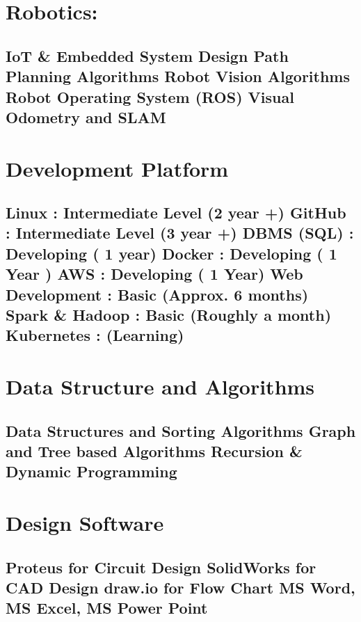 \documentclass[letterpaper]{twentysecondcv} %
\begin{document}
{\section{\large Robotics:}\subsection{\small  
\textbf{IoT \& Embedded System Design} 
\newline Path Planning Algorithms 
\newline Robot Vision Algorithms 
\newline Robot Operating System \textbf{(ROS)}
\newline \textbf{Visual Odometry and SLAM}}

\section{\large Development Platform} \subsection{\small \textbf{Linux} : Intermediate Level (2 year +) \newline \textbf{GitHub} : Intermediate Level (3 year +) \newline \textbf{DBMS} (SQL) : Developing ( 1 year)  
\newline \textbf{Docker} : Developing ( 1 Year )
\newline AWS : Developing ( 1 Year)  
\newline Web Development : Basic (Approx. 6 months)
\newline Spark \& Hadoop : Basic (Roughly a month)
\newline Kubernetes : (Learning)}

\section{\large Data Structure and Algorithms  }\subsection {\small Data Structures and Sorting Algorithms \newline Graph and Tree based Algorithms \newline Recursion \& Dynamic Programming }

\section{\large Design Software} \subsection{\small Proteus for Circuit Design \newline SolidWorks for CAD Design \newline draw.io for Flow Chart \newline MS Word, MS Excel, MS Power Point}

}
\end{document}
